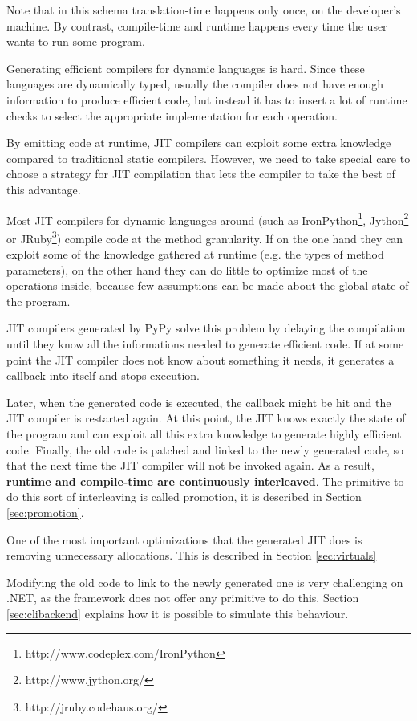 Note that in this schema translation-time happens only once, on the
developer's machine.  By contrast, compile-time and runtime happens every time
the user wants to run some program.

Generating efficient compilers for dynamic languages is hard.  Since these
languages are dynamically typed, usually the compiler does not have enough
information to produce efficient code, but instead it has to insert a lot of
runtime checks to select the appropriate implementation for each operation.

By emitting code at runtime, JIT compilers can exploit some extra knowledge
compared to traditional static compilers.  However, we need to take special
care to choose a strategy for JIT compilation that lets the compiler to take
the best of this advantage.

Most JIT compilers for dynamic languages around (such as
IronPython\footnote{http://www.codeplex.com/IronPython},
Jython\footnote{http://www.jython.org/} or
JRuby\footnote{http://jruby.codehaus.org/}) compile code at the method
granularity.  If on the one hand they can exploit some of the knowledge
gathered at runtime (e.g. the types of method parameters), on the other hand
they can do little to optimize most of the operations inside, because few
assumptions can be made about the global state of the program.

JIT compilers generated by PyPy solve this problem by delaying the compilation
until they know all the informations needed to generate efficient code.  If at
some point the JIT compiler does not know about something it needs, it
generates a callback into itself and stops execution.  

Later, when the generated code is executed, the callback might be hit and the JIT
compiler is restarted again.  At this point, the JIT knows exactly the state
of the program and can exploit all this extra knowledge to generate highly
efficient code.  Finally, the old code is patched and linked to the newly
generated code, so that the next time the JIT compiler will not be invoked
again.  As a result, \textbf{runtime and compile-time are continuously
interleaved}. The primitive to do this sort of interleaving is called promotion,
it is described in Section \ref{sec:promotion}.

One of the most important optimizations that the generated JIT does is removing
unnecessary allocations. This is described in Section \ref{sec:virtuals}

Modifying the old code to link to the newly generated one is very challenging on
.NET, as the framework does not offer any primitive to do this.  Section
\ref{sec:clibackend} explains how it is possible to simulate this behaviour.
